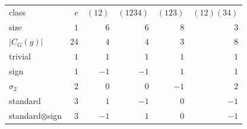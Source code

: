 \begin{tabular}{lrrrrr}
\toprule
class & $e$ & $(12)$ & $(1234)$ & $(123)$ & $(12)(34)$ \\
size & $1$ & $6$ & $6$ & $8$ & $3$ \\
$|C_G(g)|$ & $24$ & $4$ & $4$ & $3$ & $8$ \\
\midrule
trivial & $1$ & $1$ & $1$ & $1$ & $1$ \\
sign & $1$ & $-1$ & $-1$ & $1$ & $1$ \\
$\sigma_2$ & $2$ & $0$ & $0$ & $-1$ & $2$ \\
standard & $3$ & $1$ & $-1$ & $0$ & $-1$ \\
standard$\otimes$sign & $3$ & $-1$ & $1$ & $0$ & $-1$ \\
\bottomrule
\end{tabular}
